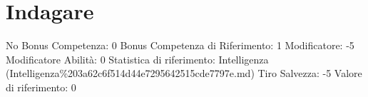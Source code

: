 \section{Indagare}\label{indagare}

\begin{description}
\tightlist
\item[Tags: ABI]
No Bonus Competenza: 0 Bonus Competenza di Riferimento: 1 Modificatore:
-5 Modificatore Abilità: 0 Statistica di riferimento: Intelligenza
(Intelligenza\%203a62c6f514d44e7295642515cde7797e.md) Tiro Salvezza: -5
Valore di riferimento: 0
\end{description}

